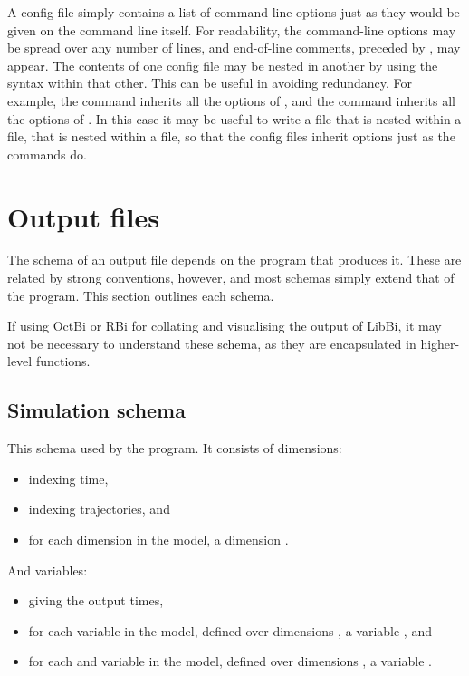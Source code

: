 A config file simply contains a list of command-line options just as they
would be given on the command line itself. For readability, the command-line
options may be spread over any number of lines, and end-of-line comments,
preceded by \bitt{\#}, may appear. The contents of one config file may be
nested in another by using the  syntax within that
other. This can be useful in avoiding redundancy. For example, the
 command inherits all the options of ,
and the  command inherits all the options of
. In this case it may be useful to write a
 file that is nested within a  file,
that is nested within a  file, so that the config files
inherit options just as the commands do.

\section{Output files}

The schema of an output file depends on the program that produces it. These
are related by strong conventions, however, and most schemas simply extend
that of the  program. This section outlines each schema.

\begin{tip}
If using OctBi or RBi for collating and visualising the output of LibBi, it
may not be necessary to understand these schema, as they are encapsulated in
higher-level functions.
\end{tip}

\subsection{Simulation schema}

This schema used by the  program. It consists of
dimensions:
\begin{itemize}
\item {} indexing time,
\item {} indexing trajectories, and
\item for each dimension  in the model, a dimension
  .
\end{itemize}
And variables:
\begin{itemize}
\item {} giving the output times,
\item for each  variable  in the model,
  defined over dimensions , a variable
  , and
\item for each  and  variable  in the
  model, defined over dimensions , a variable
  .
\end{itemize}

